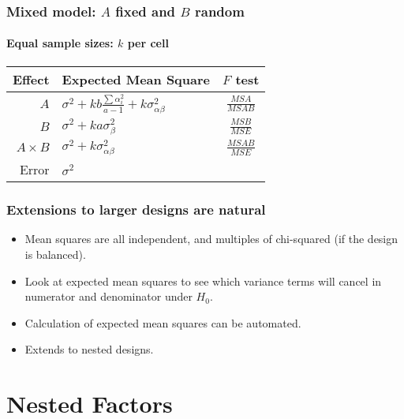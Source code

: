 \documentclass[serif]{beamer} %
\begin{document}
\begin{frame}
\frametitle{Mixed model: $A$ fixed and $B$ random}
\framesubtitle{Equal sample sizes: $k$ per cell} 
\begin{center}
\renewcommand{\arraystretch}{1.5}
\begin{tabular}{rlc}  \hline
Effect       &   Expected Mean Square &   $F$ test   \\ \hline
$A$          & $\sigma^2 + kb\frac{\sum\alpha_i^2}{a-1} + k\sigma^2_{\alpha\beta}$ 
& $\frac{MSA}{MSAB}$   \\ 
$B$          & $\sigma^2 + ka\sigma^2_\beta$ 
&  $\frac{MSB}{MSE}$  \\ 
$A \times B$ & $\sigma^2 + k\sigma^2_{\alpha\beta}$  &  $\frac{MSAB}{MSE}$  \\
Error        & $\sigma^2$            &   
\end{tabular}
\renewcommand{\arraystretch}{1.0}
\end{center}
\end{frame}

\begin{frame}
\frametitle{Extensions to larger designs are natural}
  \begin{itemize}
    \item Mean squares are all independent, and multiples of chi-squared (if the design is balanced).
    \item Look at expected mean squares to see which variance terms will cancel in numerator and denominator under $H_0$.
    \item Calculation of expected mean squares can be automated.
    \item Extends to nested designs.
  \end{itemize}
\end{frame}

\section{Nested Factors}
\end{document}
